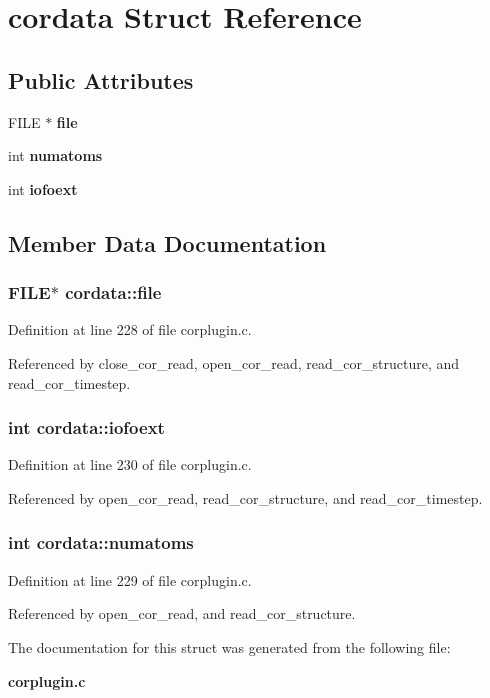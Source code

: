 \section{cordata  Struct Reference}
\label{structcordata}
\subsection*{Public Attributes}
\begin{CompactItemize}
\item 
FILE $\ast$ {\bf file}
\item 
int {\bf numatoms}
\item 
int {\bf iofoext}
\end{CompactItemize}


\subsection{Member Data Documentation}
\subsubsection{\setlength{\rightskip}{0pt plus 5cm}FILE$\ast$ cordata::file}\label{structcordata_m0}




Definition at line 228 of file corplugin.c.

Referenced by close\_\-cor\_\-read, open\_\-cor\_\-read, read\_\-cor\_\-structure, and read\_\-cor\_\-timestep.
\subsubsection{\setlength{\rightskip}{0pt plus 5cm}int cordata::iofoext}\label{structcordata_m2}




Definition at line 230 of file corplugin.c.

Referenced by open\_\-cor\_\-read, read\_\-cor\_\-structure, and read\_\-cor\_\-timestep.
\subsubsection{\setlength{\rightskip}{0pt plus 5cm}int cordata::numatoms}\label{structcordata_m1}




Definition at line 229 of file corplugin.c.

Referenced by open\_\-cor\_\-read, and read\_\-cor\_\-structure.

The documentation for this struct was generated from the following file:\begin{CompactItemize}
\item 
{\bf corplugin.c}\end{CompactItemize}
